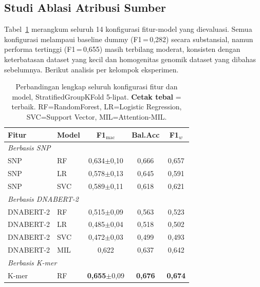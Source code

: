 \documentclass{article}
\begin{document}
\subsection{Studi Ablasi Atribusi Sumber}

Tabel~\ref{tab:ablation} merangkum seluruh 14 konfigurasi fitur-model yang
dievaluasi. Semua konfigurasi melampaui baseline dummy (F1\,=\,0,282) secara
substansial, namun performa tertinggi (F1\,=\,0,655) masih terbilang moderat,
konsisten dengan keterbatasan dataset yang kecil dan homogenitas genomik
dataset yang dibahas sebelumnya. Berikut analisis per kelompok eksperimen.

\begin{table}[t]
  \caption{Perbandingan lengkap seluruh konfigurasi fitur dan model,
    StratifiedGroupKFold 5-lipat. \textbf{Cetak tebal} = terbaik.
    RF=RandomForest, LR=Logistic Regression, SVC=Support Vector,
    MIL=Attention-MIL.}
  \label{tab:ablation}
  \begin{center}
    \begin{scriptsize}
      \setlength{\tabcolsep}{4pt}
      \begin{tabular}{llccc}
        \toprule
        Fitur            & Model & F1$_\text{mac}$ & Bal.Acc & F1$_w$ \\
        \midrule
        \multicolumn{5}{l}{\textit{Berbasis SNP}} \\
        SNP              & RF    & 0,634$\pm$0,10  & 0,666   & 0,657  \\
        SNP              & LR    & 0,578$\pm$0,13  & 0,645   & 0,591  \\
        SNP              & SVC   & 0,589$\pm$0,11  & 0,618   & 0,621  \\
        \midrule
        \multicolumn{5}{l}{\textit{Berbasis DNABERT-2}} \\
        DNABERT-2        & RF    & 0,515$\pm$0,09  & 0,563   & 0,523  \\
        DNABERT-2        & LR    & 0,485$\pm$0,04  & 0,518   & 0,502  \\
        DNABERT-2        & SVC   & 0,472$\pm$0,03  & 0,499   & 0,493  \\
        DNABERT-2        & MIL   & 0,622           & 0,637   & 0,642  \\
        \midrule
        \multicolumn{5}{l}{\textit{Berbasis K-mer}} \\
        K-mer            & RF    & \textbf{0,655}$\pm$0,09 & \textbf{0,676} & \textbf{0,674} \\
        \midrule

\end{tabular}
\end{scriptsize}
\end{center}
\end{table}
\end{document}
